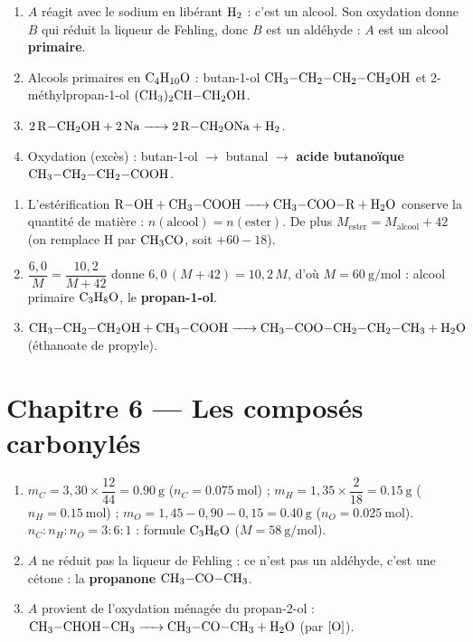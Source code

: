 \begin{enumerate}[label=\arabic*)]
\item $A$ réagit avec le sodium en libérant $\ce{H2}$ : c'est un alcool. Son oxydation
donne $B$ qui réduit la liqueur de Fehling, donc $B$ est un aldéhyde : $A$ est un
alcool \textbf{primaire}.
\item Alcools primaires en $\ce{C4H10O}$ : butan-1-ol $\ce{CH3-CH2-CH2-CH2OH}$ et
2-méthylpropan-1-ol $\ce{(CH3)2CH-CH2OH}$.
\item $\ce{2 R-CH2OH + 2 Na -> 2 R-CH2ONa + H2}$.
\item Oxydation (excès) : butan-1-ol $\to$ butanal $\to$ \textbf{acide butanoïque}
$\ce{CH3-CH2-CH2-COOH}$.
\end{enumerate}

\begin{enumerate}[label=\arabic*)]
\item L'estérification $\ce{R-OH + CH3-COOH -> CH3-COO-R + H2O}$ conserve la quantité
de matière : $n(\text{alcool}) = n(\text{ester})$. De plus $M_{\text{ester}} =
M_{\text{alcool}} + 42$ (on remplace H par $\ce{CH3CO}$, soit $+60-18$).
\item $\dfrac{6{,}0}{M} = \dfrac{10{,}2}{M+42}$ donne $6{,}0\,(M+42) = 10{,}2\,M$,
d'où $M = \SI{60}{\gram\per\mol}$ : alcool primaire $\ce{C3H8O}$, le \textbf{propan-1-ol}.
\item $\ce{CH3-CH2-CH2OH + CH3-COOH -> CH3-COO-CH2-CH2-CH3 + H2O}$ (éthanoate de propyle).
\end{enumerate}

\section{Chapitre 6 — Les composés carbonylés}

\begin{enumerate}[label=\arabic*)]
\item $m_C = 3{,}30\times\dfrac{12}{44} = \SI{0.90}{\gram}$ ($n_C = \SI{0.075}{\mol}$) ;
$m_H = 1{,}35\times\dfrac{2}{18} = \SI{0.15}{\gram}$ ($n_H = \SI{0.15}{\mol}$) ;
$m_O = 1{,}45 - 0{,}90 - 0{,}15 = \SI{0.40}{\gram}$ ($n_O = \SI{0.025}{\mol}$).
$n_C : n_H : n_O = 3 : 6 : 1$ : formule $\ce{C3H6O}$ ($M = \SI{58}{\gram\per\mol}$).
\item $A$ ne réduit pas la liqueur de Fehling : ce n'est pas un aldéhyde, c'est une
cétone : la \textbf{propanone} $\ce{CH3-CO-CH3}$.
\item $A$ provient de l'oxydation ménagée du propan-2-ol :
$\ce{CH3-CHOH-CH3 -> CH3-CO-CH3 + H2O}$ (par $\ce{[O]}$).
\end{enumerate}


